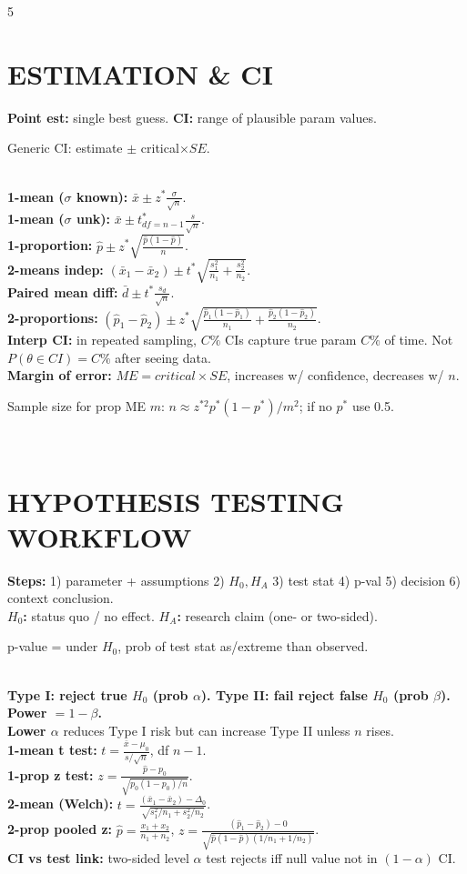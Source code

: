 \documentclass[10pt,landscape,letterpaper]{article}
\newcommand{\concept}[1]{\textcolor{conceptcyan}{\textbf{#1}}}
\newcommand{\process}[1]{\textcolor{processpurple}{\textbf{#1}}}
\newcommand{\category}[1]{\textcolor{categorygreen}{\textbf{#1}}}
\newcommand{\important}[1]{{\setlength{\fboxsep}{1pt}\colorbox{highlightyellow}{\parbox{\dimexpr\linewidth-2\fboxsep\relax}{#1}}}}
\begin{document}
\begin{multicols}{5}
\section{ESTIMATION \& CI}
\concept{Point est:} single best guess. \concept{CI:} range of plausible param values.\\
\important{Generic CI: estimate $\pm$ critical$\times SE$.}\\
\category{1-mean ($\sigma$ known):} $\bar x\pm z^*\frac{\sigma}{\sqrt n}$.\\
\category{1-mean ($\sigma$ unk):} $\bar x\pm t^*_{df=n-1}\frac{s}{\sqrt n}$.\\
\category{1-proportion:} $\hat p\pm z^*\sqrt{\frac{\hat p(1-\hat p)}{n}}$.\\
\category{2-means indep:} $(\bar x_1-\bar x_2)\pm t^*\sqrt{\frac{s_1^2}{n_1}+\frac{s_2^2}{n_2}}$.\\
\category{Paired mean diff:} $\bar d\pm t^*\frac{s_d}{\sqrt n}$.\\
\category{2-proportions:} $(\hat p_1-\hat p_2)\pm z^*\sqrt{\frac{\hat p_1(1-\hat p_1)}{n_1}+\frac{\hat p_2(1-\hat p_2)}{n_2}}$.\\
\concept{Interp CI:} in repeated sampling, $C\%$ CIs capture true param $C\%$ of time. Not $P(\theta\in CI)=C\%$ after seeing data.\\
\concept{Margin of error:} $ME=critical\times SE$, increases w/ confidence, decreases w/ $n$.\\
\important{Sample size for prop ME $m$: $n\approx z^{*2}p^*(1-p^*)/m^2$; if no $p^*$ use 0.5.}\\
\section{HYPOTHESIS TESTING WORKFLOW}
\process{Steps:} 1) parameter + assumptions 2) $H_0,H_A$ 3) test stat 4) p-val 5) decision 6) context conclusion.\\
\concept{$H_0$:} status quo / no effect. \concept{$H_A$:} research claim (one- or two-sided).\\
\important{p-value = under $H_0$, prob of test stat as/extreme than observed.}\\
\concept{Type I: reject true $H_0$ (prob $\alpha$). Type II: fail reject false $H_0$ (prob $\beta$). Power $=1-\beta$.}\\
\concept{Lower $\alpha$} reduces Type I risk but can increase Type II unless $n$ rises.\\
\category{1-mean t test:} $t=\frac{\bar x-\mu_0}{s/\sqrt n}$, df $n-1$.\\
\category{1-prop z test:} $z=\frac{\hat p-p_0}{\sqrt{p_0(1-p_0)/n}}$.\\
\category{2-mean (Welch):} $t=\frac{(\bar x_1-\bar x_2)-\Delta_0}{\sqrt{s_1^2/n_1+s_2^2/n_2}}$.\\
\category{2-prop pooled z:} $\hat p=\frac{x_1+x_2}{n_1+n_2}$, $z=\frac{(\hat p_1-\hat p_2)-0}{\sqrt{\hat p(1-\hat p)(1/n_1+1/n_2)}}$.\\
\concept{CI vs test link:} two-sided level $\alpha$ test rejects iff null value not in $(1-\alpha)$ CI.\\

\end{multicols}
\end{document}
